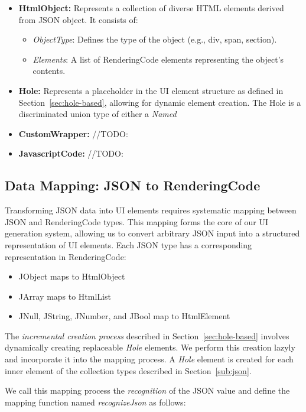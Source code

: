 \begin{itemize}
\begin{itemize}
	      \end{itemize}
	\item \textbf{HtmlObject:} Represents a collection of diverse HTML elements derived from JSON object. It consists of:
	      \begin{itemize}
		      \item \emph{ObjectType}: Defines the type of the object (e.g., div, span, section).
		      \item \emph{Elements}: A list of RenderingCode elements representing the object's contents.
	      \end{itemize}
	\item {\textbf{Hole:} Represents a placeholder in the UI element structure as defined in Section~\ref{sec:hole-based}, allowing for dynamic element creation.
	      The Hole is a discriminated union type of either a \emph{Named}
	      }

	\item {\textbf{CustomWrapper:} //TODO:}
	\item{\textbf{JavascriptCode:} //TODO:}

\end{itemize}


\subsection{Data Mapping: JSON to RenderingCode}
Transforming JSON data into UI elements requires systematic mapping between JSON and RenderingCode types.
This mapping forms the core of our UI generation system, allowing us to convert arbitrary JSON input into a structured representation of UI elements.
Each JSON type has a corresponding representation in RenderingCode:
\begin{itemize}
	\item JObject maps to HtmlObject
	\item JArray maps to HtmlList
	\item JNull, JString, JNumber, and JBool map to HtmlElement
\end{itemize}

The \emph{incremental creation process} described in Section~\ref{sec:hole-based} involves dynamically creating replaceable \emph{Hole} elements.
We perform this creation lazyly and incorporate it into the mapping process.
A \emph{Hole} element is created for each inner element of the collection types described in Section~\ref{sub:json}.


We call this mapping process the \emph{recognition} of the JSON value and define the mapping function named \emph{recognizeJson} as follows:

